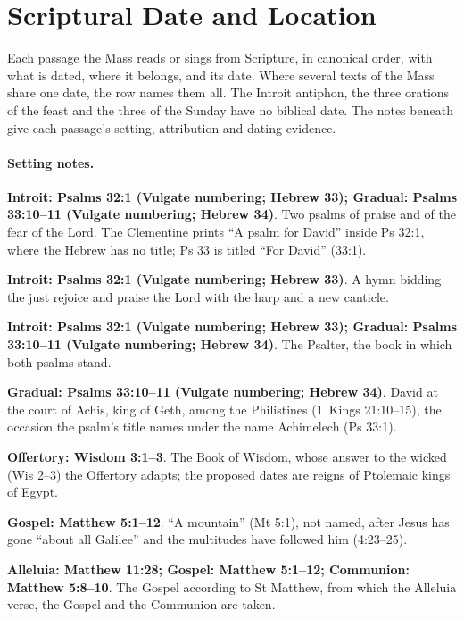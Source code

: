 \section{Scriptural Date and Location}
\label{sec:date-location}

{\small Each passage the Mass reads or sings from Scripture, in canonical
order, with what is dated, where it belongs, and its date. Where several texts
of the Mass share one date, the row names them all. The Introit antiphon, the
three orations of the feast and the three of the Sunday have no biblical date.
The notes beneath give each passage's setting, attribution and dating
evidence.\par}
\medskip



\paragraph{Setting notes.}
\noindent\textbf{Introit: Psalms 32:1 (Vulgate numbering; Hebrew 33); Gradual: Psalms 33:10--11 (Vulgate numbering; Hebrew 34)}. Two psalms of praise and of the fear of the Lord. The Clementine prints ``A psalm for David'' inside Ps 32:1, where the Hebrew has no title; Ps 33 is titled ``For David'' (33:1).

\noindent\textbf{Introit: Psalms 32:1 (Vulgate numbering; Hebrew 33)}. A hymn bidding the just rejoice and praise the Lord with the harp and a new canticle.

\noindent\textbf{Introit: Psalms 32:1 (Vulgate numbering; Hebrew 33); Gradual: Psalms 33:10--11 (Vulgate numbering; Hebrew 34)}. The Psalter, the book in which both psalms stand.

\noindent\textbf{Gradual: Psalms 33:10--11 (Vulgate numbering; Hebrew 34)}. David at the court of Achis, king of Geth, among the Philistines (1~Kings 21:10--15), the occasion the psalm's title names under the name Achimelech (Ps 33:1).

\noindent\textbf{Offertory: Wisdom 3:1--3}. The Book of Wisdom, whose answer to the wicked (Wis 2--3) the Offertory adapts; the proposed dates are reigns of Ptolemaic kings of Egypt.

\noindent\textbf{Gospel: Matthew 5:1--12}. ``A mountain'' (Mt 5:1), not named, after Jesus has gone ``about all Galilee'' and the multitudes have followed him (4:23--25).

\noindent\textbf{Alleluia: Matthew 11:28; Gospel: Matthew 5:1--12; Communion: Matthew 5:8--10}. The Gospel according to St Matthew, from which the Alleluia verse, the Gospel and the Communion are taken.

